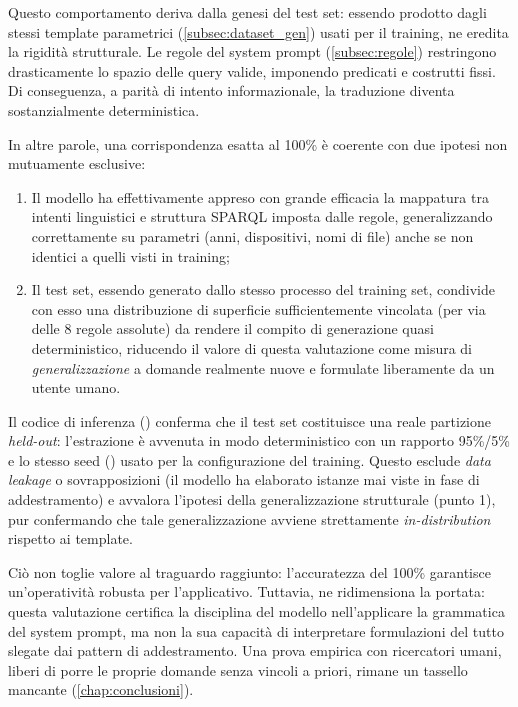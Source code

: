 Questo comportamento deriva dalla genesi del test set: essendo prodotto dagli stessi template parametrici (\cref{subsec:dataset_gen}) usati per il training, ne eredita la rigidità strutturale. Le regole del system prompt (\cref{subsec:regole}) restringono drasticamente lo spazio delle query valide, imponendo predicati e costrutti fissi. Di conseguenza, a parità di intento informazionale, la traduzione diventa sostanzialmente deterministica.

In altre parole, una corrispondenza esatta al 100\% è coerente con due ipotesi non mutuamente esclusive:

\begin{enumerate}
    \item Il modello ha effettivamente appreso con grande efficacia la mappatura tra intenti linguistici e struttura SPARQL imposta dalle regole, generalizzando correttamente su parametri (anni, dispositivi, nomi di file) anche se non identici a quelli visti in training;
    \item Il test set, essendo generato dallo stesso processo del training set, condivide con esso una distribuzione di superficie sufficientemente vincolata (per via delle 8 regole assolute) da rendere il compito di generazione quasi deterministico, riducendo il valore di questa valutazione come misura di \emph{generalizzazione} a domande realmente nuove e formulate liberamente da un utente umano.
\end{enumerate}

Il codice di inferenza () conferma che il test set costituisce una reale partizione \textit{held-out}: l'estrazione è avvenuta in modo deterministico con un rapporto 95\%/5\% e lo stesso seed () usato per la configurazione del training. Questo esclude \textit{data leakage} o sovrapposizioni (il modello ha elaborato istanze mai viste in fase di addestramento) e avvalora l'ipotesi della generalizzazione strutturale (punto 1), pur confermando che tale generalizzazione avviene strettamente \textit{in-distribution} rispetto ai template.

Ciò non toglie valore al traguardo raggiunto: l'accuratezza del 100\% garantisce un'operatività robusta per l'applicativo. Tuttavia, ne ridimensiona la portata: questa valutazione certifica la disciplina del modello nell'applicare la grammatica del system prompt, ma non la sua capacità di interpretare formulazioni del tutto slegate dai pattern di addestramento. Una prova empirica con ricercatori umani, liberi di porre le proprie domande senza vincoli a priori, rimane un tassello mancante (\cref{chap:conclusioni}).


